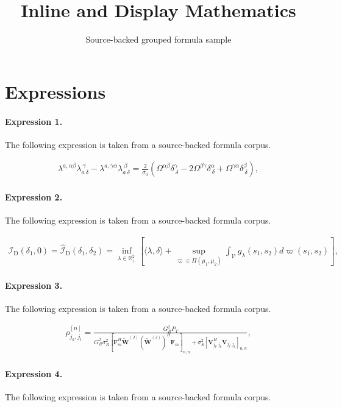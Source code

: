\documentclass[11pt]{article}
\title{Inline and Display Mathematics}
\author{Source-backed grouped formula sample}
\date{}
\begin{document}
\maketitle
\section{Expressions}
\paragraph{Expression 1.} The following expression is taken from a source-backed formula corpus.

\begin{align*}\lambda^{a,\alpha \beta} \lambda_{a~\delta}^{~\gamma} - \lambda^{a,\gamma \alpha} \lambda_{a~\delta}^{~\beta} = \frac{2}{\sigma_{0}} \left(\Omega^{\alpha \beta} \delta^{\gamma}_{~\delta} - 2 \Omega^{\beta \gamma} \delta^{\alpha}_{~\delta} + \Omega^{\gamma \alpha} \delta^{\beta}_{~\delta}\right), \end{align*}

\paragraph{Expression 2.} The following expression is taken from a source-backed formula corpus.

\begin{align*}\mathcal{I}_{\mathrm{D}}(\delta_1, 0) = \widehat{\mathcal{I}}_{\mathrm{D}} (\delta_1, \delta_2) = \inf _{\lambda \in \mathbb{R}_{+}^2 }\left[ \langle\lambda, \delta \rangle+\sup _{\varpi \in \Pi\left(\mu_1, \mu_2\right)} \int_{\mathcal{V}} g_\lambda \left(s_1, s_2\right) d \varpi(s_1,s_2)\right],\end{align*}

\paragraph{Expression 3.} The following expression is taken from a source-backed formula corpus.

\begin{align*}\rho_{j_{k},j_{l}}^{[n]}=\frac{G_{R}^{2}P_{T}}{G_{R}^{2}\sigma_{R}^{2}\left[\mathbf{F}_{m}^{H}\mathbf{\tilde{W}}^{\left(J\right)}\left(\mathbf{\tilde{W}}^{\left(J\right)}\right)^{H}\mathbf{F}_{m}\right]_{n,n}+\sigma_{S}^{2}\left[\mathbf{V}_{j_{l},j_{k}}^{H}\mathbf{V}_{j_{l},j_{k}}\right]_{n,n}},\end{align*}

\paragraph{Expression 4.} The following expression is taken from a source-backed formula corpus.
\end{document}
